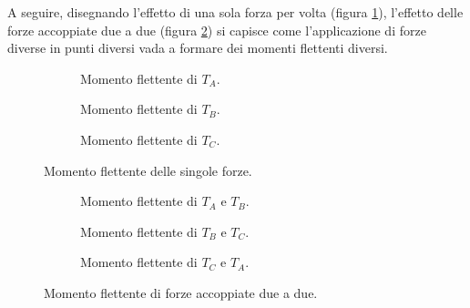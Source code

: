 \documentclass[main.tex]{subfiles}
\begin{document}
A seguire, disegnando l'effetto di una sola forza per volta (figura \ref{momento_forza_singola}), l'effetto delle forze accoppiate due a due  (figura \ref{momento_coppia_forze}) si capisce come l'applicazione di forze diverse in punti diversi vada a formare dei momenti flettenti diversi.

\begin{figure}[!tbp]
  \begin{subfigure}[b]{.3\textwidth}
  \centering
  \resizebox{.5\textwidth}{!}{}
  \caption{Momento flettente di $T_A$.}
  \end{subfigure}
  \hfill
  \begin{subfigure}[b]{.3\textwidth}
  \centering
  \resizebox{.5\textwidth}{!}{}
  \caption{Momento flettente di $T_B$.}
  \end{subfigure}
  \hfill
  \begin{subfigure}[b]{.3\textwidth}
  \centering
  \resizebox{.5\textwidth}{!}{}
  \caption{Momento flettente di $T_C$.}
  \end{subfigure}
  \caption{Momento flettente delle singole forze.}
  \label{momento_forza_singola}
\end{figure}

\begin{figure}[!tbp]
  \begin{subfigure}[b]{.3\textwidth}
  \centering
  \resizebox{.5\textwidth}{!}{}
  \caption{Momento flettente di $T_A$ e $T_B$.}
  \end{subfigure}
  \hfill
  \begin{subfigure}[b]{.3\textwidth}
  \centering
  \resizebox{.5\textwidth}{!}{}
  \caption{Momento flettente di $T_B$ e $T_C$.}
  \end{subfigure}
  \hfill
  \begin{subfigure}[b]{.3\textwidth}
  \centering
  \resizebox{.5\textwidth}{!}{}
  \caption{Momento flettente di $T_C$ e $T_A$.}
  \end{subfigure}
  \caption{Momento flettente di forze accoppiate due a due.}
  \label{momento_coppia_forze}
\end{figure}
\end{document}
